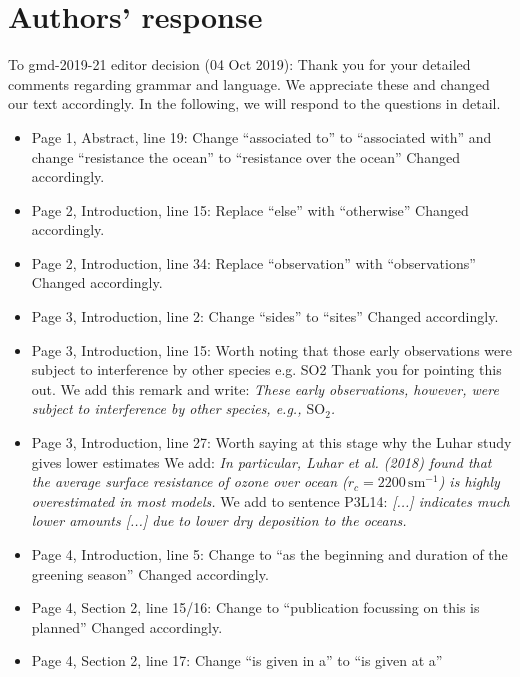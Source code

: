 
%
\section*{Authors' response}
To gmd-2019-21 editor decision (04 Oct 2019):
Thank you for your detailed comments regarding grammar and language.
We appreciate these and changed our text accordingly.
In the following, we will respond to the questions in detail.
\begin{itemize}

\item {\color{blue} Page 1, Abstract, line 19: Change “associated to” to “associated with” and change “resistance the ocean” to “resistance over the ocean”}
  Changed accordingly.
\item {\color{blue} Page 2, Introduction, line 15: Replace “else” with “otherwise”}
  Changed accordingly.
\item {\color{blue} Page 2, Introduction, line 34: Replace “observation” with “observations”}
  Changed accordingly.
\item {\color{blue} Page 3, Introduction, line 2: Change “sides” to “sites”}
  Changed accordingly.
\item {\color{blue}Page 3, Introduction, line 15: Worth noting that those early observations were subject to interference by other species e.g. SO2}
  Thank you for pointing this out. We add this remark and write: \emph{These early observations, however, were subject to interference by other species, e.g., $\mathrm{SO_2}$.}
\item {\color{blue}Page 3, Introduction, line 27: Worth saying at this stage why the Luhar study gives lower estimates}
  We add: \emph{In particular, Luhar et al. (2018) found that the average surface resistance of ozone over ocean ($r_c=2200\,\mathrm{sm^{-1}}$) is highly overestimated in most models.}
  We add to sentence P3L14: \emph{[...] indicates much lower amounts [...] due to lower dry deposition to the oceans.}
\item {\color{blue}Page 4, Introduction, line 5: Change to “as the beginning and duration of the greening season”}
  Changed accordingly.
\item {\color{blue}Page 4, Section 2, line 15/16: Change to “publication focussing on this is planned”}
  Changed accordingly.
\item {\color{blue}Page 4, Section 2, line 17: Change “is given in a” to “is given at a”}

\end{itemize}
